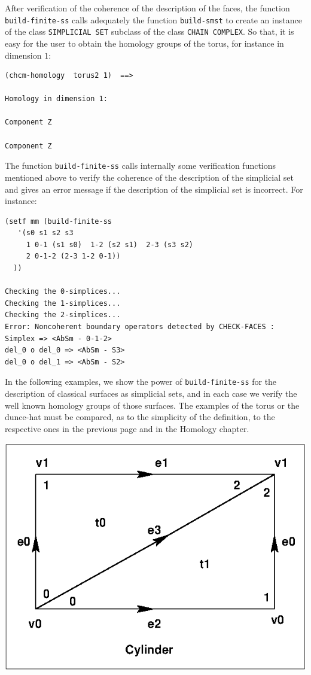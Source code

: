 After verification of the coherence of the description of the faces, the function
{\tt build-finite-ss} calls adequately the function {\tt build-smst} to create an instance
of the class {\tt SIMPLICIAL SET} subclass of the class {\tt CHAIN COMPLEX}. So that, it is easy for 
the user  to obtain the homology groups of the torus, for instance in dimension $1$:

{\footnotesize\begin{verbatim}
(chcm-homology  torus2 1)  ==>

Homology in dimension 1:

Component Z

Component Z
\end{verbatim}}
The function {\tt build-finite-ss} calls internally some verification functions mentioned above
to verify the coherence of the description of the simplicial set and gives 
an error message if the description of the simplicial set is incorrect. For instance:
{\footnotesize\begin{verbatim}
(setf mm (build-finite-ss 
   '(s0 s1 s2 s3 
     1 0-1 (s1 s0)  1-2 (s2 s1)  2-3 (s3 s2)
     2 0-1-2 (2-3 1-2 0-1))
  ))

Checking the 0-simplices...
Checking the 1-simplices...
Checking the 2-simplices...
Error: Noncoherent boundary operators detected by CHECK-FACES :
Simplex => <AbSm - 0-1-2>
del_0 o del_0 => <AbSm - S3>
del_0 o del_1 => <AbSm - S2>
\end{verbatim}}
\vskip 0.35cm
In the following examples, we show the power of {\tt build-finite-ss} for the description
of classical surfaces as simplicial sets, and in each case we  verify the well known 
homology groups of those surfaces. The examples of the torus
or the dunce-hat must be compared, as to the simplicity of the definition, to the respective 
ones in the previous page and in  the Homology chapter.
\newpage
%
\vskip 0.40cm
\centerline{\includegraphics{cylinss.eps}}
\vskip 0.40cm
%

